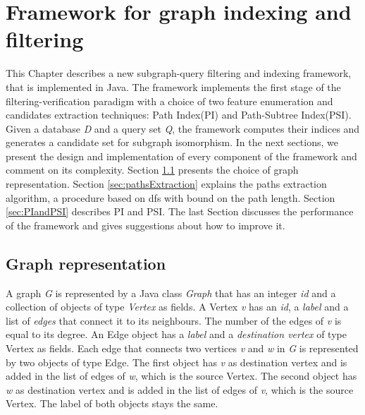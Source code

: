 \documentclass{l4proj}
\begin{document}


\chapter{Framework for graph indexing and filtering}
This Chapter describes a new subgraph-query filtering and indexing framework, that is implemented in Java. The framework implements the first stage of the filtering-verification paradigm with a choice of two feature enumeration and candidates extraction techniques: Path Index(PI) and Path-Subtree Index(PSI). Given a database \emph{D} and a query set \emph{Q}, the framework computes their indices and generates a candidate set for subgraph isomorphism. In the next sections, we present the design and implementation of every component of the framework and comment on its complexity. Section \ref{sec:graph-representation} presents the choice of graph representation. Section \ref{sec:pathsExtraction} explains the paths extraction algorithm, a procedure based on \gls{dfs} with bound on the path length. Section \ref{sec:PIandPSI} describes PI and PSI. The last Section discusses the performance of the framework and gives suggestions about how to improve it.

\section{Graph representation}
\label{sec:graph-representation}
A graph \emph{G} is represented by a Java class \emph{Graph} that has an integer \emph{id} and a collection of objects of type \emph{Vertex} as fields. A Vertex \emph{v} has an \emph{id}, a \emph{label} and a list of \emph{edges} that connect it to its neighbours. The number of the edges of \emph{v} is equal to its degree. An Edge object has a \emph{label} and a \emph{destination vertex} of type Vertex as fields. Each edge that connects two vertices \emph{v} and \emph{w} in \emph{G} is represented by two objects of type Edge. The first object has \emph{v} as destination vertex and is added in the list of edges of \emph{w}, which is the source Vertex. The second object has \emph{w} as destination vertex and is added in the list of edges of \emph{v}, which is the source Vertex. The label of both objects stays the same.
\end{document}
